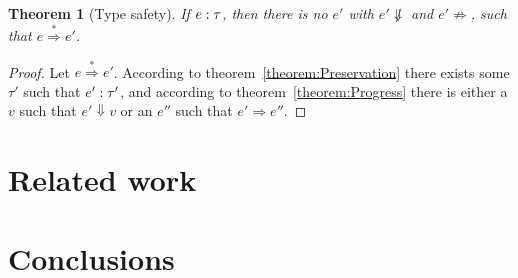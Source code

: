 \documentclass[12pt,a2paper,draft]{article}
\newcommand{\tj}[2]{\mbox{\ensuremath{{#1}:{#2}}}}
\newtheorem{theorem}{Theorem}
\begin{document}
\begin{theorem}[Type safety]
  If $\tj{e}{\tau}$, then there is no $e'$ with
  $e' \not\Downarrow$ and $e' \not\Rightarrow$,
  such that $e \stackrel{*}{\Rightarrow} e'$.
\end{theorem}

\begin{proof}
  Let $e \stackrel{*}{\Rightarrow} e'$. According to theorem~\ref{theorem:Preservation} there
  exists some $\tau'$ such that $\tj{e'}{\tau'}$, and according to theorem~\ref{theorem:Progress}
  there is either a $v$ such that $e' \Downarrow v$ or an $e''$ such that $e' \Rightarrow e''$.
\end{proof}


\section{Related work}


\section{Conclusions}




\end{document}
